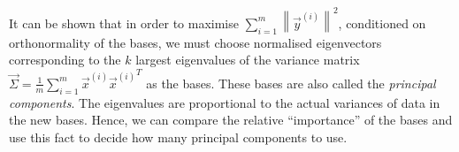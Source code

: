 		It can be shown that in order to maximise $\sum_{i = 1}^m \left\| \vec y^{(i)} \right\|^2$, conditioned on orthonormality of the bases, we must choose normalised eigenvectors corresponding to the $k$ largest eigenvalues of the variance matrix $\vec \Sigma = \frac{1}{m} \sum_{i = 1}^m \vec x^{(i)} {\vec x^{(i)}}^T$ as the bases. These bases are also called the \emph{principal components}. The eigenvalues are proportional to the actual variances of data in the new bases. Hence, we can compare the relative ``importance'' of the bases and use this fact to decide how many principal components to use.